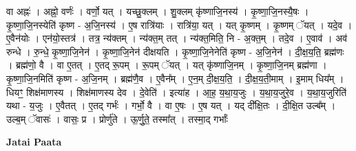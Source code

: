 \documentclass[17pt]{extarticle}
\begin{document}
वा अह्नः॑ । अह्नो॒ वर्णः॑ । वर्णो॒ यत् । यच्छु॒क्लम् । शु॒क्लम् कृ॑ष्णाजि॒नस्य॑ । कृ॒ष्णा॒जि॒नस्यै॒षः । कृ॒ष्णा॒जि॒नस्येति॑ कृष्ण - अ॒जि॒नस्य॑ । ए॒ष रात्रि॑याः । रात्रि॑या॒ यत् । यत् कृ॒ष्णम् । कृ॒ष्णम् ॅयत् । यदे॒व । ए॒वैन॑योः । एन॑यो॒स्तत्र॑ । तत्र॒ न्य॑क्तम् । न्य॑क्त॒म् तत् । न्य॑क्त॒मिति॒ नि - अ॒क्त॒म् । तदे॒व । ए॒वाव॑ । अव॑ रुन्धे । रु॒न्धे॒ कृ॒ष्णा॒जि॒नेन॑ । कृ॒ष्णा॒जि॒नेन॑ दीक्षयति । कृ॒ष्णा॒जि॒नेनेति॑ कृष्ण - अ॒जि॒नेन॑ । दी॒क्ष॒य॒ति॒ ब्रह्म॑णः । ब्रह्म॑णो॒ वै । वा ए॒तत् । ए॒तद् रू॒पम् । रू॒पम् ॅयत् । यत् कृ॑ष्णाजि॒नम् । कृ॒ष्णा॒जि॒नम् ब्रह्म॑णा । कृ॒ष्णा॒जि॒नमिति॑ कृष्ण - अ॒जि॒नम् । ब्रह्म॑णै॒व । ए॒वैन᳚म् । ए॒न॒म् दी॒क्ष॒य॒ति॒ । दी॒क्ष॒य॒ती॒माम् । इ॒माम् धिय᳚म् । धियꣳ॒॒ शिक्ष॑माणस्य । शिक्ष॑माणस्य देव । दे॒वेति॑ । इत्या॑ह । आ॒ह॒ य॒था॒य॒जुः । य॒था॒य॒जुरे॒व । य॒था॒य॒जुरिति॑ यथा - य॒जुः । ए॒वैतत् । ए॒तद् गर्भः॑ । गर्भो॒ वै । वा ए॒षः । ए॒ष यत् । यद् दी᳚क्षि॒तः । दी॒क्षि॒त उल्ब᳚म् । उल्ब॒म् ॅवासः॑ । वासः॒ प्र । प्रोर्णु॑ते । ऊ॒र्णु॒ते॒ तस्मा᳚त् । तस्मा॒द् गर्भाः᳚ \newline

\textbf{Jatai Paata} \newline
\end{document}

